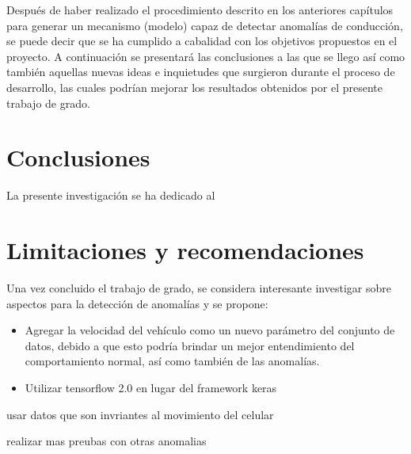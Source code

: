  
Despu\'{e}s de haber realizado el procedimiento descrito en los anteriores cap\'{i}tulos para generar un mecanismo (modelo) capaz de detectar anomal\'{i}as de conducci\'{o}n, se puede decir que se ha cumplido a cabalidad con los objetivos propuestos en el proyecto. A continuaci\'{o}n se presentar\'{a} las conclusiones a las que se llego as\'{i} como tambi\'{e}n aquellas nuevas ideas e inquietudes que surgieron durante el proceso de desarrollo, las cuales podr\'{i}an mejorar los resultados obtenidos por el presente trabajo de grado.


\section{Conclusiones}

La presente investigaci\'{o}n se ha dedicado al 


\section{Limitaciones y recomendaciones}

Una vez concluido el trabajo de grado, se considera interesante investigar sobre aspectos para la detecci\'{o}n de anomal\'{i}as y se propone:

\begin{itemize}
\item Agregar la velocidad del veh\'{i}culo como un nuevo par\'{a}metro del conjunto de datos, debido a que esto podr\'{i}a brindar un mejor entendimiento del comportamiento normal, as\'{i} como tambi\'{e}n de las anomal\'{i}as.
\item Utilizar tensorflow 2.0 en lugar del framework keras 
\end{itemize}

usar datos que son invriantes al movimiento del celular



realizar mas preubas con otras anomalias

